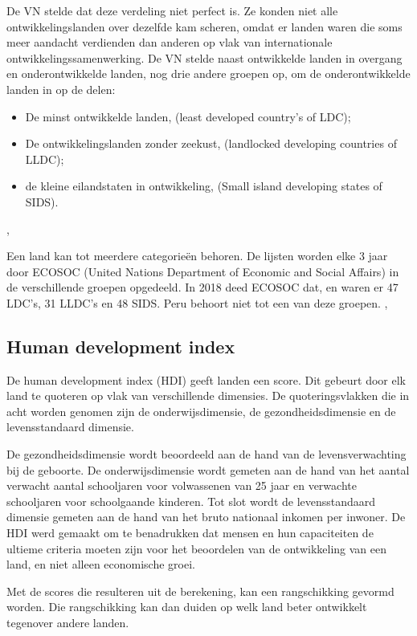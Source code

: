 De VN stelde dat deze verdeling niet perfect is. Ze konden niet alle ontwikkelingslanden over dezelfde kam scheren, omdat er landen waren die soms meer aandacht verdienden dan anderen op vlak van internationale ontwikkelingssamenwerking. De VN stelde naast ontwikkelde landen in overgang en onderontwikkelde landen, nog drie andere groepen op, om de onderontwikkelde landen in op de delen: 

\begin{itemize}
\item De minst ontwikkelde landen, (least developed country's of LDC);
\item De ontwikkelingslanden zonder zeekust, (landlocked developing countries of LLDC);
\item de kleine eilandstaten in ontwikkeling, (Small island developing states of SIDS).
\end{itemize}
\autocite{MarcJ.Bossuyt2005},

Een land kan tot meerdere categorieën behoren. De lijsten worden elke 3 jaar door ECOSOC (United Nations Department of Economic and Social Affairs) in de verschillende groepen opgedeeld. \autocite{ecosoc2018} In 2018 deed ECOSOC dat, en waren er 47 LDC's, 31 LLDC's en 48 SIDS. Peru behoort niet tot een van deze groepen. \autocite{MarcJ.Bossuyt2005},

\subsection{Human development index}
De human development index (HDI) geeft landen een score. Dit gebeurt door elk land te quoteren op vlak van verschillende dimensies. De quoteringsvlakken die in acht worden genomen zijn de onderwijsdimensie, de gezondheidsdimensie en de levensstandaard dimensie. \autocite{UNDP2019}

De gezondheidsdimensie wordt beoordeeld aan de hand van de levensverwachting bij de geboorte. De onderwijsdimensie wordt gemeten aan de hand van het aantal verwacht aantal schooljaren voor volwassenen van 25 jaar en verwachte schooljaren voor schoolgaande kinderen. Tot slot wordt de levensstandaard dimensie gemeten aan de hand van het bruto nationaal inkomen per inwoner. De HDI werd gemaakt om te benadrukken dat mensen en hun capaciteiten de ultieme criteria moeten zijn voor het beoordelen van de ontwikkeling van een land, en niet alleen economische groei. \autocite{UNDP2019}

Met de scores die resulteren uit de berekening, kan een rangschikking gevormd worden. Die rangschikking kan dan duiden op welk land beter ontwikkelt tegenover andere landen. 

